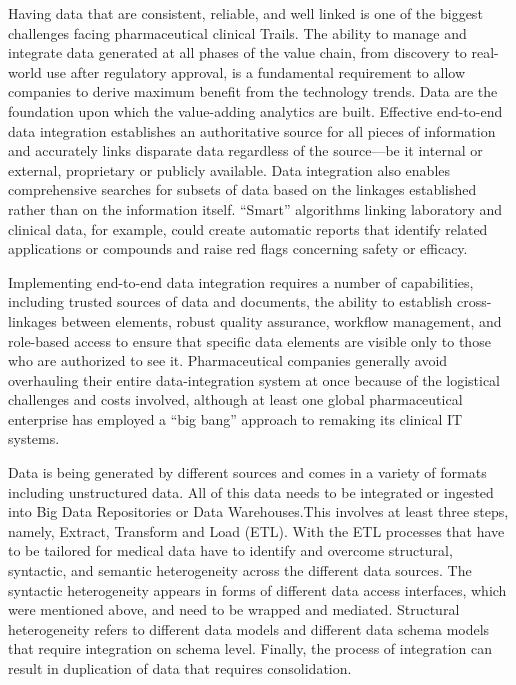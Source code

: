 \documentclass[sigconf]{acmart}
\begin{document}
Having data that are consistent, reliable, and well linked is one of the biggest challenges facing pharmaceutical clinical Trails. The ability to manage and integrate data generated at all phases of the value chain, from discovery to real-world use after regulatory approval, is a fundamental requirement to allow companies to derive maximum benefit from the technology trends. Data are the foundation upon which the value-adding analytics are built. Effective end-to-end data integration establishes an authoritative source for all pieces of information and accurately links disparate data regardless of the source—be it internal or external, proprietary or publicly available. Data integration also enables comprehensive searches for subsets of data based on the linkages established rather than on the information itself. “Smart” algorithms linking laboratory and clinical data, for example, could create automatic reports that identify related applications or compounds and raise red flags concerning safety or efficacy.

Implementing end-to-end data integration requires a number of capabilities, including trusted sources of data and documents, the ability to establish cross-linkages between elements, robust quality assurance, workflow management, and role-based access to ensure that specific data elements are visible only to those who are authorized to see it. Pharmaceutical companies generally avoid overhauling their entire data-integration system at once because of the logistical challenges and costs involved, although at least one global pharmaceutical enterprise has employed a “big bang” approach to remaking its clinical IT systems.

Data is being generated by different sources and comes in a variety of formats including unstructured data. All of this data needs to be integrated or ingested into Big Data Repositories or Data Warehouses.This involves at least three steps, namely, Extract, Transform and Load (ETL). With the ETL processes that have to be tailored for medical data have to identify and overcome structural, syntactic, and semantic heterogeneity across the different data sources. The syntactic heterogeneity appears in forms of different data access interfaces, which were mentioned above, and need to be wrapped and
mediated. Structural heterogeneity refers to different data models and different data schema models
that require integration on schema level. Finally, the process of integration can result in duplication of
data that requires consolidation.
\end{document}
